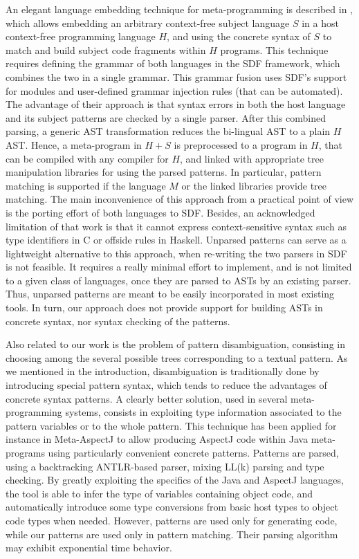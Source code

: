 \documentclass{sigplanconf}
\begin{document}
An elegant language embedding technique for meta-programming is
described in \cite{metaprog}, which allows embedding an arbitrary
context-free subject language $S$ in a host context-free programming
language $H$, and using the concrete syntax of $S$ to match and build
subject code fragments within $H$ programs. This technique requires
defining the grammar of both languages in the SDF framework, which
combines the two in a single grammar. This grammar fusion uses SDF's
support for modules and user-defined grammar injection rules (that can
be automated). The advantage of their approach is that syntax errors
in both the host language and its subject patterns are checked by a
single parser. After this combined parsing, a generic AST
transformation reduces the bi-lingual AST to a plain $H$ AST. Hence, a
meta-program in $H+S$ is preprocessed to a program in $H$, that can be
compiled with any compiler for $H$, and linked with appropriate tree
manipulation libraries for using the parsed patterns. In particular,
pattern matching is supported if the language $M$ or the linked
libraries provide tree matching. The main inconvenience of this
approach from a practical point of view is the porting effort of both
languages to SDF. Besides, an acknowledged limitation of that work is
that it cannot express context-sensitive syntax such as type
identifiers in C or offside rules in Haskell. Unparsed patterns can
serve as a lightweight alternative to this approach, when re-writing
the two parsers in SDF is not feasible. It requires a really minimal
effort to implement, and is not limited to a given class of languages,
once they are parsed to ASTs by an existing parser. Thus, unparsed
patterns are meant to be easily incorporated in most existing
tools. In turn, our approach does not provide support for building
ASTs in concrete syntax, nor syntax checking of the patterns.

Also related to our work is the problem of pattern disambiguation,
consisting in choosing among the several possible trees corresponding
to a textual pattern. As we mentioned in the introduction,
disambiguation is traditionally done by introducing special pattern
syntax, which tends to reduce the advantages of concrete syntax
patterns. A clearly better solution, used in several meta-programming
systems, consists in exploiting type information associated to the
pattern variables or to the whole pattern. This technique has been
applied for instance in Meta-AspectJ \cite{maj} to allow producing
AspectJ code within Java meta-programs using particularly convenient
concrete patterns. Patterns are parsed, using a backtracking
ANTLR-based parser, mixing LL(k) parsing and type checking. By greatly
exploiting the specifics of the Java and AspectJ languages, the tool
is able to infer the type of variables containing object code, and
automatically introduce some type conversions from basic host types to
object code types when needed. However, patterns are used only for
generating code, while our patterns are used only in pattern
matching. Their parsing algorithm may exhibit exponential time
behavior.
\end{document}
